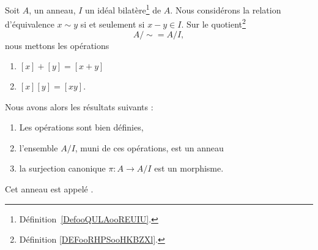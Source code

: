 \begin{propositionDef}      \label{PROPooGXMRooTcUGbi}
    Soit \( A\), un anneau, \( I\) un idéal bilatère\footnote{Définition~\ref{DefooQULAooREUIU}.} de \( A\). Nous considérons la relation d'équivalence \( x\sim y\) si et seulement si \( x-y\in I\). Sur le quotient\footnote{Définition \ref{DEFooRHPSooHKBZXl}.}
    \begin{equation}
        A/\sim=A/I,
    \end{equation}
    nous mettons les opérations
    \begin{enumerate}
        \item
            \( [x]+[y]=[x+y]\)
        \item
            \( [x][y]=[xy]\).
    \end{enumerate}
    Nous avons alors les résultats suivants :
    \begin{enumerate}
        \item       \label{ITEMooEJPEooRKAqmS}
            Les opérations sont bien définies,
        \item       \label{ITEMooYBEGooTlHgNz}
            l'ensemble \( A/I\), muni de ces opérations, est un anneau
        \item       \label{ITEMooLNRLooMkoWXZ}
            la surjection canonique \( \pi\colon A\to A/I\) est un morphisme.
    \end{enumerate}
    Cet anneau est appelé .
\end{propositionDef}

